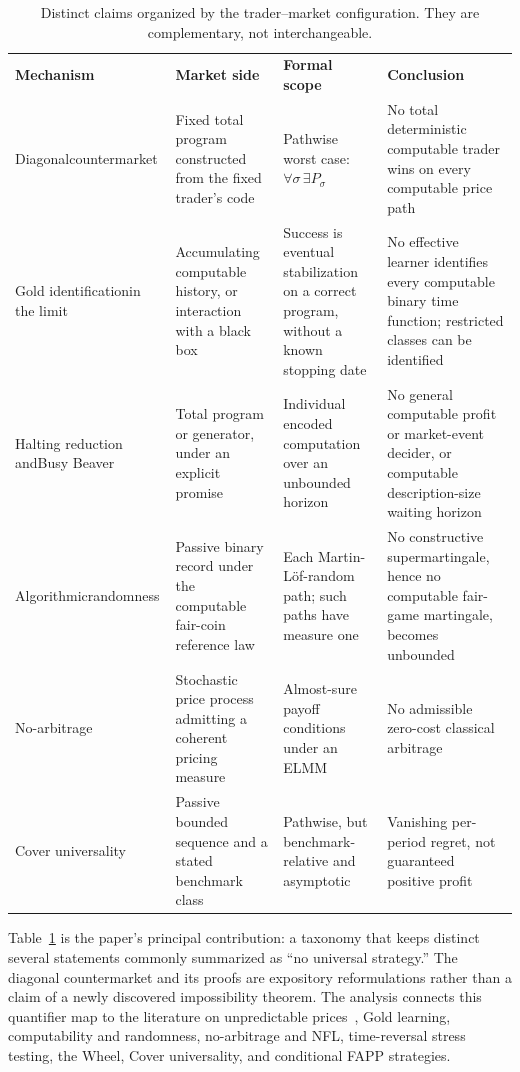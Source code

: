 \documentclass[aps,pra,reprint,superscriptaddress,amsmath,amssymb,floatfix]{revtex4-2}
\theoremstyle{plain}
\theoremstyle{definition}
\theoremstyle{remark}
\begin{document}
\begin{table}[t]
\caption{\label{tab:claimmap}Distinct claims organized by the trader--market
configuration. They are complementary, not interchangeable.}
\centering
\begin{ruledtabular}
\begin{tabular}{p{}p{}p{}p{}}
\textbf{Mechanism} & \textbf{Market side} & \textbf{Formal scope}
& \textbf{Conclusion} \\
\colrule
Diagonal\newline\mbox{countermarket}
& Fixed total program constructed from the fixed trader's code
& Pathwise worst case:
\(\forall\sigma\,\exists P_\sigma\)
& No total deterministic computable trader wins on every computable price path \\
Gold identification\newline in the limit
& Accumulating computable history, or interaction with a black box
& Success is eventual stabilization on a correct program, without a known
stopping date
& No effective learner identifies every computable binary time function;
restricted classes can be identified \\
Halting reduction and\newline Busy Beaver
& Total program or generator, under an explicit promise
& Individual encoded computation over an unbounded horizon
& No general computable profit or market-event decider, or computable
description-size waiting horizon \\
Algorithmic\newline randomness
& Passive binary record under the computable fair-coin reference law
& Each Martin-L\"of-random path; such paths have measure one
& No constructive supermartingale, hence no computable fair-game martingale,
becomes unbounded \\
No-arbitrage
& Stochastic price process admitting a coherent pricing measure
& Almost-sure payoff conditions under an ELMM
& No admissible zero-cost classical arbitrage \\
Cover universality
& Passive bounded sequence and a stated benchmark class
& Pathwise, but benchmark-relative and asymptotic
& Vanishing per-period regret, not guaranteed positive profit \\
\end{tabular}
\end{ruledtabular}
\end{table}

Table~\ref{tab:claimmap} is the paper's principal contribution: a taxonomy that
keeps distinct several statements commonly summarized as ``no universal
strategy.'' The diagonal countermarket and its proofs are expository
reformulations rather than a claim of a newly discovered impossibility theorem.
The analysis connects this quantifier map to the literature on unpredictable
prices~\cite{Bachelier1900,Samuelson1965,Fama1970}, Gold learning, computability
and randomness, no-arbitrage and NFL, time-reversal stress testing, the Wheel,
Cover universality, and conditional FAPP strategies.
\end{document}
